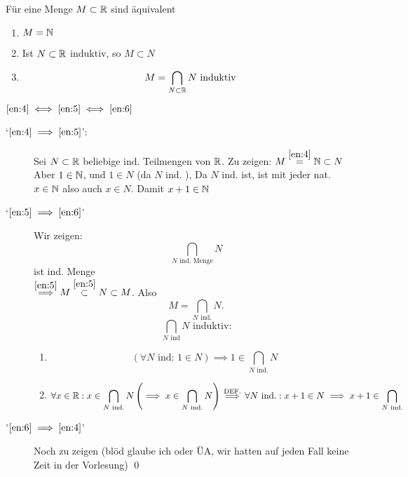 \documentclass[consecutivenumbering]{gadsescript}
\begin{document}
\begin{subproposition}
	Für eine Menge $ M \subset \mathbb{R} $ sind äquivalent
	\begin{enumerate}[label=(\roman*)]
		\item \label{en:4}$ M = \mathbb{N} $
		\item \label{en:5}Ist $ N \subset \mathbb{R} $ induktiv, so $ M \subset N $
		\item \label{en:6}\[ M = \bigcap_{N\subset\mathbb{R}} N \text{ induktiv} \]
	\end{enumerate}

	$\ref{en:4} \iff \ref{en:5} \iff \ref{en:6}$
	\begin{subproof}
		\begin{description}
			\item[`$\ref{en:4} \implies \ref{en:5}$':] Sei $ N \subset \mathbb{R} $ beliebige ind. Teilmengen von $\mathbb{R}$. Zu zeigen: $ M \overset{\ref{en:4}}{=} \mathbb{N} \subset N $\\
			Aber $ 1 \in \mathbb{N} $, und $ 1 \in N $ (da $ N $ ind. ), Da $ N $ ind. ist, ist mit jeder nat. $ x \in \mathbb{N} $ also auch $ x \in N $. Damit $ x + 1 \in \mathbb{N} $ 

		\item[`$\ref{en:5} \implies \ref{en:6}$'] Wir zeigen: \[\bigcap_{N \text{ ind. Menge}} N \] ist ind. Menge\\
			$\overset{\ref{en:5}}{\implies} M \overset{\ref{en:5}}{\subset} N \subset M $. Also \[ M = \bigcap_{N \text{ ind.}} N. \]
				\[\bigcap_{N \text{ ind}} N \text{ induktiv:}\]
				\begin{enumerate}[label=(\roman*)]
					\item \[ ( \forall N \text{ ind: } 1 \in N) \implies 1 \in \bigcap_{N \text{ ind.}} N \]
					\item \[ \forall x \in \mathbb{R} : x \in \bigcap_{ N \text{ ind.}} N \left( \implies x \in \bigcap_{N \text{ ind.}} N \right) \overset{\text{DEF.}}{\implies} \forall N \text{ ind.} : x + 1 \in N \implies x + 1 \in \bigcap_{N \text{ ind.}}\]
				\end{enumerate}
			\item['$\ref{en:6} \implies \ref{en:4}$'] Noch zu zeigen (blöd glaube ich oder ÜA, wir hatten auf jeden Fall keine Zeit in der Vorlesung) \qed
		\end{description}

	\end{subproof}
\end{subproposition}
\end{document}
